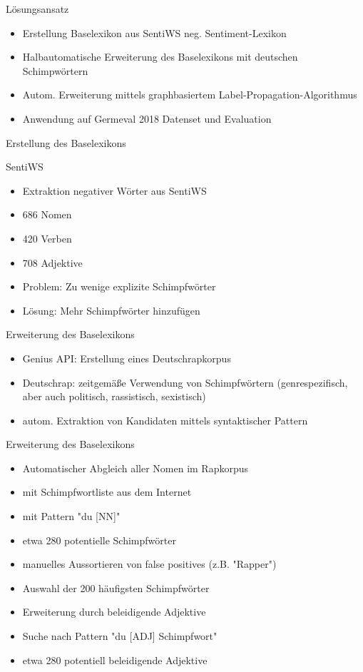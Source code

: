 \documentclass{beamer}
\begin{document}
\begin{frame}{Lösungsansatz}
\begin{itemize}
\item Erstellung Baselexikon aus SentiWS neg. Sentiment-Lexikon
\item Halbautomatische Erweiterung des Baselexikons mit deutschen Schimpwörtern
\item Autom. Erweiterung mittels graphbasiertem Label-Propagation-Algorithmus
\item Anwendung auf Germeval 2018 Datenset und Evaluation
\end{itemize}
\end{frame}
\begin{frame}{Erstellung des Baselexikons}
\begin{block}{SentiWS}
	\begin{itemize}
		\item Extraktion negativer Wörter aus SentiWS
		\item 686 Nomen
		\item 420 Verben
		\item 708 Adjektive
		\item Problem: Zu wenige explizite Schimpfwörter
		\item Lösung: Mehr Schimpfwörter hinzufügen
	\end{itemize}
\end{block}
\end{frame}

\begin{frame}{Erweiterung des Baselexikons}
\begin{itemize}
\item Genius API: Erstellung eines Deutschrapkorpus 
\item Deutschrap: zeitgemäße Verwendung von Schimpfwörtern (genrespezifisch, aber auch politisch, rassistisch, sexistisch)
\item autom. Extraktion von Kandidaten mittels syntaktischer Pattern
\end{itemize}
\end{frame}

\begin{frame}{Erweiterung des Baselexikons}
	\begin{itemize}
		\item Automatischer Abgleich aller Nomen im Rapkorpus
		\item mit Schimpfwortliste aus dem Internet
		\item mit Pattern "du [NN]"
		\item etwa 280 potentielle Schimpfwörter
		\item manuelles Aussortieren von false positives (z.B. "Rapper")
		\item Auswahl der 200 häufigsten Schimpfwörter
		\item Erweiterung durch beleidigende Adjektive
		\item Suche nach Pattern "du [ADJ] Schimpfwort"
		\item etwa 280 potentiell beleidigende Adjektive
	\end{itemize}
\end{frame}
\end{document}
